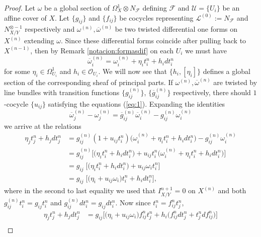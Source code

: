 \documentclass[reqno]{amsart}
\theoremstyle{plain}
\newcommand{\OO}{\mathcal{O}}
\renewcommand{\L}{\mathcal{L}}
\newcommand{\U}{\mathcal{U}}
\newcommand{\F}{\mathscr{F}}
\newcommand{\mybar}[3]{%
    \mathrlap{\hspace{#2}\overline{\scalebox{#1}[1]{\phantom{\ensuremath{#3}}}}}\ensuremath{#3}
}
\theoremstyle{definition}
\theoremstyle{named}
\begin{document}
\begin{proof}
Let $\omega$ be a global section of $\Omega^1_X\otimes N_\F$ defining $\F$ and $\U = \{ U_i\}$ be an affine cover of $X$. Let $\{g_{ij}\}$ and $\{f_{ij} \}$ be cocycles representing $\L^{(0)}:=N_\F$ and $N_{X/Y}^{\otimes -1}$ respectively and $\omega^{(n)},\overline{\omega}^{(n)}$ be two twisted differential one forms on $X^{(n)}$ extending $\omega$. Since these differential forms coincide after pulling back to $X^{(n-1)}$, then by Remark \ref{notacion:formasdif} on each $U_i$ we must have 
\begin{equation}\label{eq:transitividad}
\overline{\omega}^{(n)}_i = \omega^{(n)}_i + \eta_i t_i^n + h_i dt_i^n    
\end{equation}
for some $\eta_i\in \Omega^1_{U_i}$ and $h_i\in \OO_{U_i}$. We will now see that $\{h_i,[\eta_i]\}$ defines a global section of the corresponding sheaf of principal parts. If $\omega^{(n)},\overline{\omega}^{(n)}$ are twisted by line bundles \smash{$\L^{(n)}$, $\mybar{1}{0pt}{\L}^{(n)}$} with transition functions $\big\{g_{ij}^{(n)}\big\}$, $\big\{\overline{g}_{ij}^{(n)}\big\}$ respectively, there should $1$-cocycle $\{u_{ij}\}$ satisfying the equations (\ref{eq:1}). Expanding the identities
\begin{equation*}
\overline{\omega}^{(n)}_j-\omega_j^{(n)}= \overline{g}_{ij}^{(n)}\overline{\omega}^{(n)}_i-g_{ij}^{(n)}\omega^{(n)}_i
\end{equation*}
we arrive at the relations
\begin{align*}
\eta_j t_j^n + h_j dt_j^n & = g_{ij}^{(n)}(1+u_{ij} t_i^n)\big(\omega^{(n)}_i + \eta_i t_i^n + h_i dt_i^n\big)-g_{ij}^{(n)}\omega^{(n)}_i\\
 & = g_{ij}^{(n)}\Big[\big(\eta_i t_i^n + h_i dt_i^n\big)+ u_{ij} t_i^n\big(\omega^{(n)}_i + \eta_i t_i^n + h_i dt_i^n\big)\Big]\\
 & = g_{ij}\;\Big[\big(\eta_i t_i^n + h_i dt_i^n\big)+ u_{ij}\omega_it_i^n\Big]\\
 & = g_{ij}\;\Big[\big(\eta_i+u_{ij}\omega_i\big) t_i^n + h_i dt_i^n\Big],
\end{align*}
where in the second to last equality we used that $I_{X/Y}^{n+1}=0$ on $X^{(n)}$ and both $g_{ij}^{(n)} t_i^n = g_{ij} t_i^n$ and $g_{ij}^{(n)}dt^n_i=g_{ij} dt_i^n$.
Now since $t_i^n= f_{ij}^n t_j^n$, 
\begin{align*}
\eta_j t_j^n + h_j dt_j^n& = g_{ij}\Big[\big(\eta_i+u_{ij}\omega_i\big)f_{ij}^n t_j^n + h_i\big(f_{ij}^ndt_j^n+t_j^ndf_{ij}^n\big)\Big]\\

\end{align*}
\end{proof}
\end{document}

